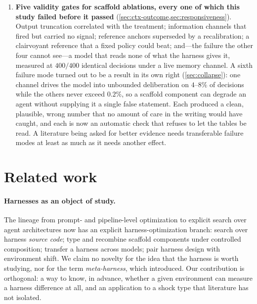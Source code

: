 \documentclass[11pt]{article}
\begin{document}
\begin{enumerate}[leftmargin=1.4em]
\item \textbf{Five validity gates for scaffold ablations, every one of which this study failed
before it passed} (\cref{sec:ctx-outcome,sec:responsiveness}). Output truncation correlated with the
treatment; information channels that fired but carried no signal; reference anchors superseded by a
recalibration; a clairvoyant reference that a fixed policy could beat; and---the failure the other
four cannot see---a model that reads none of what the harness gives it, measured at $400/400$
identical decisions under a live memory channel. A sixth failure mode turned out to be a result in
its own right (\cref{sec:collapse}): one channel drives the model into unbounded deliberation on
$4$--$8\%$ of decisions while the others never exceed $0.2\%$, so a scaffold component can degrade
an agent without supplying it a single false statement. Each produced a clean, plausible, wrong number that
no amount of care in the writing would have caught, and each is now an automatic check that refuses
to let the tables be read. A literature being asked for better evidence
needs transferable failure modes at least as much as it needs another effect.
\end{enumerate}

\section{Related work}
\label{sec:related}

\paragraph{Harnesses as an object of study.}
The lineage from prompt- and pipeline-level optimization
\citep{yang2023opro,fernando2023promptbreeder,khattab2023dspy,yuksekgonul2024textgrad} to explicit
search over agent architectures \citep{hu2024adas,zhang2024aflow,zhang2025dgm} now has an explicit
harness-optimization branch: \citet{lee2026metaharness} search over harness \emph{source code};
\citet{chen2026agentspec} type and recombine scaffold components under controlled composition;
\citet{xu2026lifeharness} transfer a harness across models; \citet{kim2026interplay} pair harness
design with environment shift. We claim no novelty for the idea that the harness is worth studying,
nor for the term \emph{meta-harness}, which \citet{lee2026metaharness} introduced. Our contribution
is orthogonal: a way to know, in advance, whether a given environment can measure a harness
difference at all, and an application to a shock type that literature has not isolated.
\end{document}
